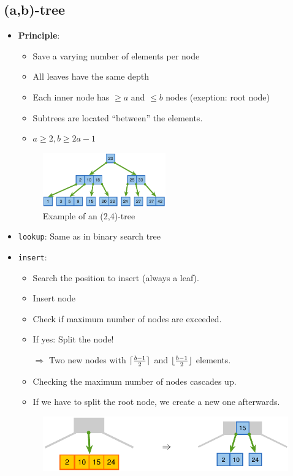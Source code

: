 \documentclass[12pt, a4paper]{scrartcl}
\renewcommand{\implies}{\Rightarrow}
\newcommand{\imgwidth}{.7\textwidth}
\DeclarePairedDelimiter{\floor}{\lfloor}{\rfloor}
\DeclarePairedDelimiter{\ceil}{\lceil}{\rceil}
\begin{document}
\subsection{(a,b)-tree}
\label{sec:ab-tree}
\begin{itemize}
\item \textbf{Principle}:
  \begin{itemize}
  \item Save a varying number of elements per node
  \item All leaves have the same depth
  \item Each inner node has $\ge a$ and $\le b$ nodes (exeption: root node)
  \item Subtrees are located ``between'' the elements.
  \item $a\ge 2, b\ge 2a-1$
  \end{itemize}
  \begin{figure}[htbp]
    \centering
    \includegraphics[width=0.5\textwidth]{2-4_tree}
    \caption{Example of an (2,4)-tree}
    \label{fig:2-4_tree}
  \end{figure}
\item \texttt{lookup}: Same as in binary search tree
\item \texttt{insert}:
  \begin{itemize}
  \item Search the position to insert (always a leaf).
  \item Insert node
  \item Check if maximum number of nodes are exceeded.
  \item If yes: Split the node!
  \item[$\implies$] Two new nodes with $\ceil{\frac{b-1}{2}}$ and $\floor{\frac{b-1}{2}}$ elements.
  \item Checking the maximum number of nodes cascades up.
  \item If we have to split the root node, we create a new one afterwards.
  \end{itemize}
  \begin{figure}[htbp]
    \centering
    \includegraphics[width=\imgwidth]{split_node}

\end{figure}
\end{itemize}
\end{document}
